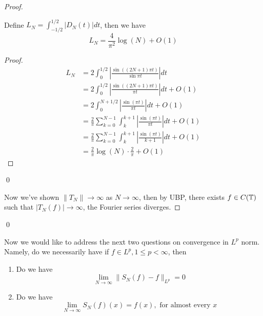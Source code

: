 \begin{proof}
    \begin{lemma}
        Define $L_N=\int_{-1/2}^{1/2}|D_N(t)|dt$, then we have
        \begin{equation*}
            L_N=\frac{4}{\pi^2}\log(N)+O(1)
        \end{equation*}
    \end{lemma}
    \begin{proof}
        \begin{align*}
            L_N&=2\int_0^{1/2}\left|\frac{\sin((2N+1)\pi t)}{\sin{\pi t}}\right|dt\\
            &=2\int_0^{1/2}\left|\frac{\sin((2N+1)\pi t)}{{\pi t}}\right|dt+O(1)\\
            &=2\int_0^{N+1/2}\left|\frac{\sin(\pi t)}{\pi t} \right|dt+O(1)\\
            &=\frac{2}{\pi}\sum_{k=0}^{N-1}\int_k^{k+1}\left|\frac{\sin(\pi t)}{\pi t} \right|dt + O(1)\\
            &=\frac{2}{\pi}\sum_{k=0}^{N-1}\int_{k}^{k+1}\left|\frac{\sin(\pi t)}{k+1} \right|dt + O(1)\\
            &=\frac{2}{\pi}\log(N)\cdot\frac{2}{\pi}+ O(1)
        \end{align*}
    \end{proof}
    \qed

    Now we've shown $\|T_N\|\to\infty$ as $N\to\infty$, then by UBP, there exists $f\in C(\mathbb{T})$ such that $|T_N(f)|\to\infty$, the Fourier series diverges.
\end{proof}
\qed

Now we would like to address the next two questions on convergence in $L^p$ norm. Namely, do we necessarily have if $f\in L^p, 1\leq p<\infty$, then
\begin{enumerate}
    \item Do we have
     \begin{equation*}
        \lim_{N\to\infty}\|S_N(f)-f\|_{L^p}=0
    \end{equation*}
    \item Do we have
        \begin{equation*}
            \lim_{N\to\infty}S_N(f)(x)=f(x), \text{ for almost every } x
        \end{equation*}
\end{enumerate}

